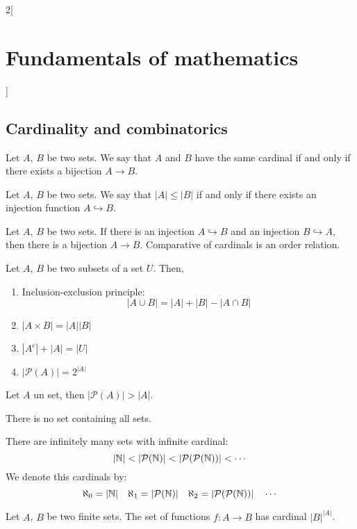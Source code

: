 \documentclass[../../../main.tex]{subfiles}
\begin{document}
\begin{multicols}{2}[\section{Fundamentals of mathematics}]
  \subsection{Cardinality and combinatorics}
  \begin{definition}
    Let $A$, $B$ be two sets. We say that $A$ and $B$ have the same cardinal if and only if there exists a bijection $A\rightarrow B$.
  \end{definition}
  \begin{definition}
    Let $A$, $B$ be two sets. We say that $|A|\leq|B|$ if and only if there exists an injection function $A\hookrightarrow B$.
  \end{definition}
  \begin{theorem}
    Let $A$, $B$ be two sets. If there is an injection $A\hookrightarrow B$ and an injection $B\hookrightarrow A$, then there is a bijection $A\rightarrow B$. Comparative of cardinals is an order relation.
  \end{theorem}
  \begin{proposition}
    Let $A$, $B$ be two subsets of a set $U$. Then,
    \begin{enumerate}
      \item Inclusion-exclusion principle: $$|A\cup B|=|A|+|B|-|A\cap B|$$
      \item $|A\times B|=|A||B|$
      \item $|A^c|+|A|=|U|$
      \item $|\mathcal{P}(A)|=2^{|A|}$
    \end{enumerate}
  \end{proposition}
  \begin{theorem}
    Let $A$ un set, then $|\mathcal{P}(A)|>|A|$.
  \end{theorem}
  \begin{corollary}
    There is no set containing all sets.
  \end{corollary}
  \begin{corollary}
    There are infinitely many sets with infinite cardinal: $$|\NN|<|\mathcal{P}(\NN)|<|\mathcal{P}(\mathcal{P}(\NN))|<\cdots$$ We denote this cardinals by: $$\aleph_0=|\mathbb{N}|\quad \aleph_1=|\mathcal{P}(\mathbb{N})|\quad \aleph_2=|\mathcal{P}(\mathcal{P}(\mathbb{N}))|\quad\cdots$$
  \end{corollary}
  \begin{proposition}
    Let $A$, $B$ be two finite sets. The set of functions $f:A\rightarrow B$ has cardinal $|B|^{|A|}$.
  \end{proposition}

\end{multicols}
\end{document}
